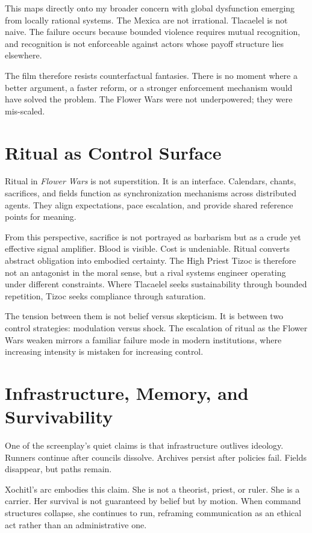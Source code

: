 \documentclass[12pt]{article}
\begin{document}
This maps directly onto my broader concern with global dysfunction emerging from locally rational systems. The Mexica are not irrational. Tlacaelel is not naive. The failure occurs because bounded violence requires mutual recognition, and recognition is not enforceable against actors whose payoff structure lies elsewhere.

The film therefore resists counterfactual fantasies. There is no moment where a better argument, a faster reform, or a stronger enforcement mechanism would have solved the problem. The Flower Wars were not underpowered; they were mis-scaled.

\section*{Ritual as Control Surface}

Ritual in \textit{Flower Wars} is not superstition. It is an interface. Calendars, chants, sacrifices, and fields function as synchronization mechanisms across distributed agents. They align expectations, pace escalation, and provide shared reference points for meaning.

From this perspective, sacrifice is not portrayed as barbarism but as a crude yet effective signal amplifier. Blood is visible. Cost is undeniable. Ritual converts abstract obligation into embodied certainty. The High Priest Tizoc is therefore not an antagonist in the moral sense, but a rival systems engineer operating under different constraints. Where Tlacaelel seeks sustainability through bounded repetition, Tizoc seeks compliance through saturation.

The tension between them is not belief versus skepticism. It is between two control strategies: modulation versus shock. The escalation of ritual as the Flower Wars weaken mirrors a familiar failure mode in modern institutions, where increasing intensity is mistaken for increasing control.

\section*{Infrastructure, Memory, and Survivability}

One of the screenplay's quiet claims is that infrastructure outlives ideology. Runners continue after councils dissolve. Archives persist after policies fail. Fields disappear, but paths remain.

Xochitl's arc embodies this claim. She is not a theorist, priest, or ruler. She is a carrier. Her survival is not guaranteed by belief but by motion. When command structures collapse, she continues to run, reframing communication as an ethical act rather than an administrative one.
\end{document}

